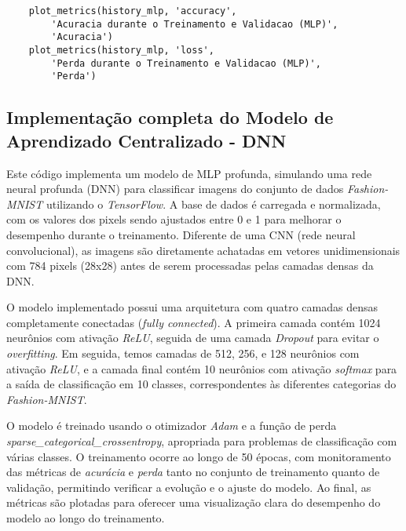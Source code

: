 \begin{lstlisting}
    plot_metrics(history_mlp, 'accuracy', 
        'Acuracia durante o Treinamento e Validacao (MLP)', 
        'Acuracia')
    plot_metrics(history_mlp, 'loss', 
        'Perda durante o Treinamento e Validacao (MLP)', 
        'Perda')
\end{lstlisting}

\subsection{Implementação completa do Modelo de Aprendizado Centralizado - DNN}

Este código implementa um modelo de MLP profunda, simulando uma rede neural profunda (DNN) para classificar imagens do conjunto de dados \textit{Fashion-MNIST} utilizando o \textit{TensorFlow}. A base de dados é carregada e normalizada, com os valores dos pixels sendo ajustados entre 0 e 1 para melhorar o desempenho durante o treinamento. Diferente de uma CNN (rede neural convolucional), as imagens são diretamente achatadas em vetores unidimensionais com 784 pixels (28x28) antes de serem processadas pelas camadas densas da DNN.

O modelo implementado possui uma arquitetura com quatro camadas densas completamente conectadas (\textit{fully connected}). A primeira camada contém 1024 neurônios com ativação \textit{ReLU}, seguida de uma camada \textit{Dropout} para evitar o \textit{overfitting}. Em seguida, temos camadas de 512, 256, e 128 neurônios com ativação \textit{ReLU}, e a camada final contém 10 neurônios com ativação \textit{softmax} para a saída de classificação em 10 classes, correspondentes às diferentes categorias do \textit{Fashion-MNIST}.

O modelo é treinado usando o otimizador \textit{Adam} e a função de perda \textit{sparse\_categorical\_crossentropy}, apropriada para problemas de classificação com várias classes. O treinamento ocorre ao longo de 50 épocas, com monitoramento das métricas de \textit{acurácia} e \textit{perda} tanto no conjunto de treinamento quanto de validação, permitindo verificar a evolução e o ajuste do modelo. Ao final, as métricas são plotadas para oferecer uma visualização clara do desempenho do modelo ao longo do treinamento.

